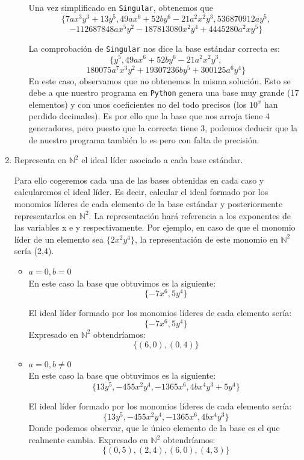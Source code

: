 \documentclass[10pt,a4paper]{article}
\begin{document}
\begin{enumerate}[label=(\alph*)]
\begin{itemize}
			Una vez simplificado en \texttt{Singular}, obtenemos que
			\[
				\{7ax^3y^3+13y^5,49ax^6+52by^6-21a^2x^2y^3, 536870912ay^5,
			\]
			\[
				-112687848ax^5y^2 - 187813080x^2y^4 + 4445280a^2xy^5\}
			\]
			
			La comprobación de \texttt{Singular} nos dice la base estándar correcta es:
			\[
				\{y^5, 49ax^6+52by^6-21a^2x^2y^3, 
			\]
			\[
				180075 a^7 x^3y^2 + 19307236 b y^5 + 300125a^6y^4 \}
			\]
			En este caso, observamos que no obtenemos la misma solución. Esto se debe a que nuestro programa en \texttt{Python} genera una base muy grande (17 elementos) y con unos coeficientes no del todo precisos (los \(10^x\) han perdido decimales). Es por ello que la base que nos arroja tiene 4 generadores, pero puesto que la correcta tiene 3, podemos deducir que la de nuestro programa también lo es pero con falta de precisión.
	\end{itemize}
	\item Representa en \(\mathbb{N}^2\) el ideal líder asociado a cada base estándar.
	
	Para ello cogeremos cada una de las bases obtenidas en cada caso y calcularemos el ideal líder. Es decir, calcular el ideal formado por los monomios líderes de cada elemento de la base estándar y posteriormente representarlos en \(\mathbb{N}^2\). La representación hará referencia a los exponentes de las variables x e y respectivamente. Por ejemplo, en caso de que el monomio líder de un elemento sea $\{2x^2 y^4\}$, la representación de este monomio en \(\mathbb{N}^2\) sería (2,4).
	
	\begin{itemize}
		\item \(a = 0, b = 0\) \\
		En este caso la base que obtuvimos es la siguiente:
		\[
		\{-7x^6, 5y^4\}
		\]
		
		El ideal líder formado por los monomios líderes de cada elemento sería:
		\[
		\{-7x^6, 5y^4\}
		\]
		Expresado en \(\mathbb{N}^2\) obtendríamos:
		\[
		\{ (6,0), (0,4)\}
		\]
		
		
		\item \(a = 0, b \neq 0\) \\
		En este caso la base que obtuvimos es la siguiente:
		\[
		\{13 y^5, -455 x^2 y^4, -1365 x^6, 4b x^4 y^3 + 5 y^4\}
		\]
		
		El ideal líder formado por los monomios líderes de cada elemento sería:
		\[
		\{13 y^5, -455 x^2 y^4, -1365 x^6, 4b x^4 y^3\}
		\]
		Donde podemos observar, que le único elemento de la base es el que realmente cambia. Expresado en \(\mathbb{N}^2\) obtendríamos:
		\[
		\{ (0,5), (2,4), (6,0), (4,3)\}
		\]
		

\end{itemize}
\end{enumerate}
\end{document}
